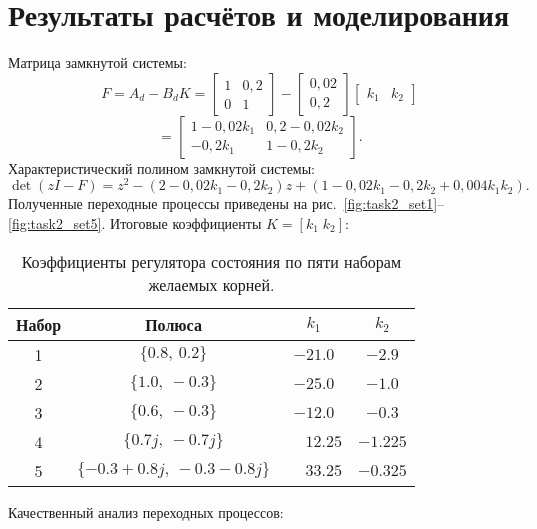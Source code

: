 \section{Результаты расчётов и моделирования}
Матрица замкнутой системы:
\[
  F = A_d - B_d K = \begin{bmatrix} 1 & 0{,}2 \\ 0 & 1 \end{bmatrix} - \begin{bmatrix} 0{,}02 \\ 0{,}2 \end{bmatrix} \begin{bmatrix} k_1 & k_2 \end{bmatrix}
\]
\[
  = \begin{bmatrix} 1-0{,}02k_1 & 0{,}2-0{,}02k_2 \\ -0{,}2k_1 & 1-0{,}2k_2 \end{bmatrix}.
\]
Характеристический полином замкнутой системы:
\[
  \det(zI - F) = z^2 - (2-0{,}02k_1-0{,}2k_2)z + (1-0{,}02k_1-0{,}2k_2+0{,}004k_1k_2).
\]
Полученные переходные процессы приведены на рис.~\ref{fig:task2_set1}–\ref{fig:task2_set5}. Итоговые коэффициенты \(K=[k_1\;k_2]\):

\begin{table}[H]
  \centering
  \begin{tabular}{cccc}
    \toprule
    Набор & Полюса & $k_1$ & $k_2$ \\
    \midrule
    1 & $\{0.8,\ 0.2\}$ & $-21.0$ & $-2.9$ \\
    2 & $\{1.0,\ -0.3\}$ & $-25.0$ & $-1.0$ \\
    3 & $\{0.6,\ -0.3\}$ & $-12.0$ & $-0.3$ \\
    4 & $\{0.7j,\ -0.7j\}$ & $\phantom{-}12.25$ & $-1.225$ \\
    5 & $\{-0.3\!+\!0.8j,\ -0.3\!-\!0.8j\}$ & $\phantom{-}33.25$ & $-0.325$ \\
    \bottomrule
  \end{tabular}
  \caption{Коэффициенты регулятора состояния по пяти наборам желаемых корней.}
\end{table}

Качественный анализ переходных процессов:


